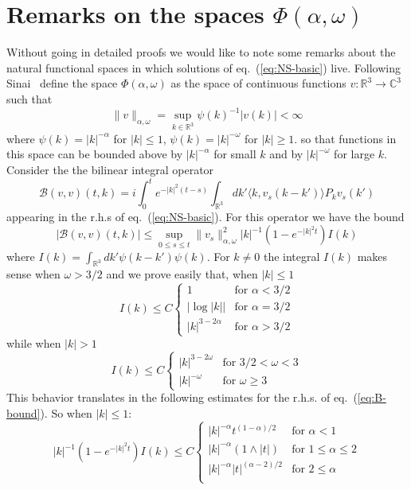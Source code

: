 \documentclass[a4paper,12pt,reqno]{amsart}
\newcommand{\1}{{\bf 1}}
\newcommand{\RR}{\mathbb{R}}
\newcommand{\CC}{\mathbb{C}}
\begin{document}
\section{Remarks on the spaces $\Phi(\alpha,\omega)$}
\label{sec:remarks2}
Without going in detailed proofs we would like to note some remarks
about the natural functional spaces in which solutions of
eq.~(\ref{eq:NS-basic})  live. Following Sinai~\cite{Sinai1} define the
space $\Phi(\alpha,\omega)$ as the space of continuous functions $v :
\RR^3 \to \CC^3$ such that 
$$
\|v\|_{\alpha,\omega} = \sup_{k \in \RR^3} \psi(k)^{-1} |v(k)| <\infty
$$
where  $\psi(k) = |k|^{-\alpha}$ for $|k| \le 1$, $\psi(k) =
|k|^{-\omega}$ for $|k| \ge 1$.
so that functions in this space can be bounded above by $|k|^{-\alpha}$ for
small $k$ and by $|k|^{-\omega}$ for large $k$. 
Consider the the bilinear integral operator
\begin{equation}
  \label{eq:bilin}
\mathcal{B}(v,v)(t,k) = i \int_0^t e^{-|k|^2 (t-s)}  
 \int_{\RR^3}dk' \langle k, v_s(k-k')\rangle P_k v_s(k') 
\end{equation}
appearing in the r.h.s of eq.~(\ref{eq:NS-basic}). For this operator
we have the bound
\begin{equation}
  \label{eq:B-bound}
|\mathcal{B}(v,v)(t,k)| \le \sup_{0 \le s \le t}
\|v_s\|_{\alpha,\omega}^2 |k|^{-1} (1-e^{-|k|^2 t}) I(k)  
\end{equation}
where
$
I(k) = \int_{\RR^3} dk' \psi(k-k') \psi(k)
$.
 For $k \neq 0$ the integral $I(k)$
makes sense when $\omega > 3/2$ and we prove easily that, when $|k|
\le 1$
\begin{equation*}
I(k) \le C \begin{cases}
1 & \text{for $\alpha < 3/2$}\\
|\log|k|| & \text{for $\alpha = 3/2$} \\
|k|^{3-2\alpha} & \text{for $\alpha > 3/2$}
\end{cases}  
\end{equation*}
while when $|k|> 1$
\begin{equation*}
I(k) \le C \begin{cases}
|k|^{3-2\omega} & \text{for $3/2 <\omega < 3$}\\
|k|^{-\omega} & \text{for $\omega \ge 3$}
\end{cases}  
\end{equation*}
This behavior translates in the following estimates for the r.h.s. of eq.~(\ref{eq:B-bound}).
So when $|k|
\le 1$:
\begin{equation*}
|k|^{-1} (1-e^{-|k|^2 t}) I(k) \le C \begin{cases}
 |k|^{-\alpha} t^{(1-\alpha)/2} & \text{for $\alpha < 1$}\\
 |k|^{-\alpha} (1 \wedge |t|) & \text{for $1 \le \alpha \le 2$}\\
 |k|^{-\alpha} |t|^{(\alpha-2)/2} & \text{for $2 \le \alpha$}\\
\end{cases}  
\end{equation*}
\end{document}
